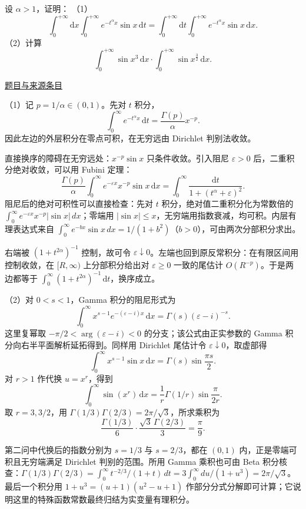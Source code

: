 \documentclass[12pt,fontset=fandol]{ctexart}
\begin{document}
\begin{example}[来源序号5]\label{ex:ch07-13th-A:5}\label{pr:ch07-13th-A:5}

设 $\alpha>1$，证明：
（1）\[
\int_{0}^{+\infty}\mathrm{d}x\int_{0}^{+\infty}e^{-t^{\alpha}x}\sin x\,\mathrm{d}t=\int_{0}^{+\infty}\mathrm{d}t\int_{0}^{+\infty}e^{-t^{\alpha}x}\sin x\,\mathrm{d}x.
\]
（2）计算
\[
\int_{0}^{+\infty}\sin x^{3}\,\mathrm{d}x\cdot\int_{0}^{+\infty}\sin x^{\frac{3}{2}}\,\mathrm{d}x.
\]

\par\href{https://github.com/lzxcr/cmc-mathematics/blob/64916fa1fdbc3e444a652eca204d5669058ee321/src/problems/preliminary/13/05.md}{题目与来源条目}

\end{example}

\begin{solve}\label{ans:ch07-13th-A:5}

（1）记 $p=1/\alpha\in(0,1)$。先对 $t$ 积分，
\[
\int_0^\infty e^{-t^\alpha x}\,\mathrm dt
=\frac{\Gamma(p)}\alpha x^{-p}.
\]
因此左边的外层积分在零点可积，在无穷远由 Dirichlet 判别法收敛。

直接换序的障碍在无穷远处：$x^{-p}\sin x$ 只条件收敛。引入阻尼 $\varepsilon>0$ 后，二重积分绝对收敛，可以用 Fubini 定理：
\[
\frac{\Gamma(p)}\alpha\int_0^\infty e^{-\varepsilon x}x^{-p}\sin x\,\mathrm dx
=\int_0^\infty\frac{\mathrm dt}{1+(t^\alpha+\varepsilon)^2}.
\]
阻尼后的绝对可积性可以直接检查：先对 $t$ 积分，绝对值二重积分化为常数倍的 $\int_0^\infty e^{-\varepsilon x}x^{-p}|\sin x|\,dx$；零端用 $|\sin x|\le x$，无穷端用指数衰减，均可积。内层有理表达式来自 $\int_0^\infty e^{-bx}\sin x\,dx=1/(1+b^2)$（$b>0$），可由两次分部积分求出。

右端被 $(1+t^{2\alpha})^{-1}$ 控制，故可令 $\varepsilon\downarrow0$。左端也回到原反常积分：在有限区间用控制收敛，在 $[R,\infty)$ 上分部积分给出对 $\varepsilon\geq0$ 一致的尾估计 $O(R^{-p})$。于是两边都等于 $\int_0^\infty(1+t^{2\alpha})^{-1}\,\mathrm dt$，换序成立。

（2）对 $0<s<1$，Gamma 积分的阻尼形式为
\[
\int_0^\infty x^{s-1}e^{-(\varepsilon-i)x}\,\mathrm dx
=\Gamma(s)(\varepsilon-i)^{-s}.
\]
这里复幂取 $-\pi/2<\arg(\varepsilon-i)<0$ 的分支；该公式由正实参数的 Gamma 积分向右半平面解析延拓得到。同样用 Dirichlet 尾估计令 $\varepsilon\downarrow0$，取虚部得
\[
\int_0^\infty x^{s-1}\sin x\,\mathrm dx
=\Gamma(s)\sin\frac{\pi s}{2}.
\]
对 $r>1$ 作代换 $u=x^r$，得到
\[
\int_0^\infty\sin(x^r)\,\mathrm dx
=\frac1r\Gamma(1/r)\sin\frac{\pi}{2r}.
\]
取 $r=3,3/2$，用 $\Gamma(1/3)\Gamma(2/3)=2\pi/\sqrt3$，所求乘积为
\[
\frac{\Gamma(1/3)}6\cdot
\frac{\sqrt3\,\Gamma(2/3)}3=\frac\pi9.
\]

第二问中代换后的指数分别为 $s=1/3$ 与 $s=2/3$，都在 $(0,1)$ 内，正是零端可积且无穷端满足 Dirichlet 判别的范围。所用 Gamma 乘积也可由 Beta 积分核查：$\Gamma(1/3)\Gamma(2/3)=\int_0^\infty t^{-2/3}/(1+t)\,dt=3\int_0^\infty du/(1+u^3)=2\pi/\sqrt3$。最后一个积分用 $1+u^3=(u+1)(u^2-u+1)$ 作部分分式分解即可计算；它说明这里的特殊函数常数最终归结为实变量有理积分。

\end{solve}
\end{document}
